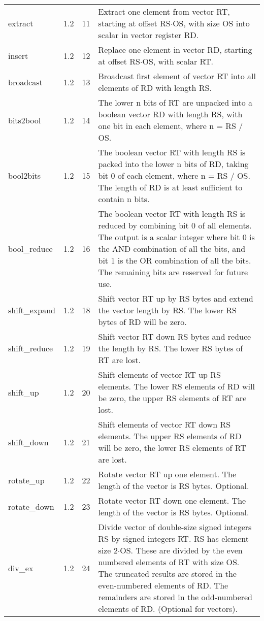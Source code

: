 \documentclass[forwardcom.tex]{subfiles}
\begin{document}
\begin{longtable} {|p{20mm}|p{10mm}|p{8mm}|p{75mm}|}
extract       & 1.2 & 11 & Extract one element from vector RT, starting at offset RS$\cdot$OS, with size OS into scalar in vector register RD. \\
insert        & 1.2 & 12 & Replace one element in vector RD, starting at offset RS$\cdot$OS, with scalar RT. \\
broadcast     & 1.2 & 13 & Broadcast first element of vector RT into all elements of RD with length RS. \\
bits2bool     & 1.2 & 14 & The lower n bits of RT are unpacked into a boolean vector RD with length RS, with one bit in each element, where n = RS / OS. \\
bool2bits     & 1.2 & 15 & The boolean vector RT with length RS is packed into the lower n bits of RD, taking bit 0 of each element, where n = RS / OS. The
length of RD is at least sufficient to contain n bits. \\
bool\_reduce  & 1.2 & 16 & The boolean vector RT with length RS is reduced by combining bit 0 of all elements. The output is a scalar integer where bit 0 is the
AND combination of all the bits, and bit 1 is the OR combination of
all the bits. The remaining bits are reserved for future use. \\
shift\_expand & 1.2 & 18 & Shift vector RT up by RS bytes and extend the vector length by RS. The lower RS bytes of RD will be zero. \\
shift\_reduce & 1.2 & 19 & Shift vector RT down RS bytes and reduce the length by RS. The lower RS bytes of RT are lost. \\
shift\_up     & 1.2 & 20 & Shift elements of vector RT up RS elements. The lower RS elements of RD will be zero, the upper RS elements of RT are lost. \\
shift\_down   & 1.2 & 21 & Shift elements of vector RT down RS elements. The upper RS
elements of RD will be zero, the lower RS elements of RT are lost. \\
rotate\_up  & 1.2 & 22 & Rotate vector RT up one element. The length of the vector is RS bytes. Optional. \\
rotate\_down  & 1.2 & 23 & Rotate vector RT down one element. The length of the vector is RS bytes. Optional. \\
div\_ex    & 1.2 & 24 & Divide vector of double-size signed integers RS by signed integers RT. RS has element size 2$\cdot$OS. These are divided by the even numbered
elements of RT with size OS. The truncated results are stored in
the even-numbered elements of RD. The remainders are stored in
the odd-numbered elements of RD. (Optional for vectors). \\

\end{longtable}
\end{document}
